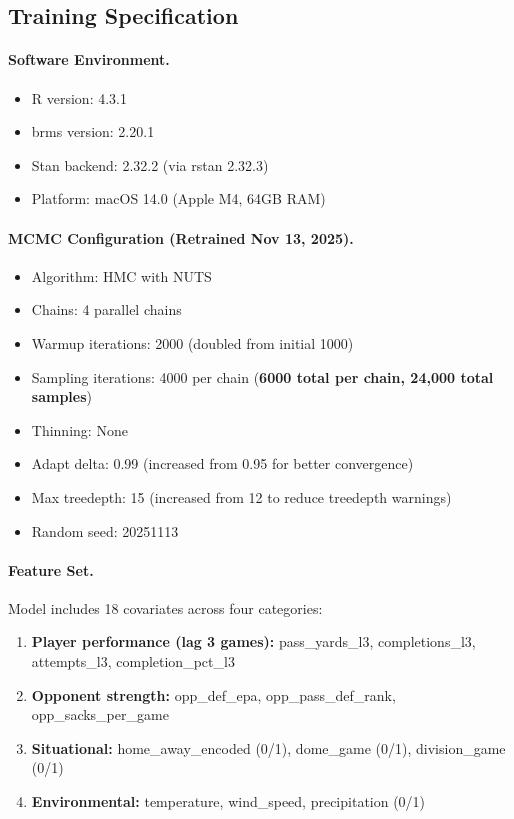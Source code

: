\subsection{Training Specification}

\paragraph{Software Environment.}
\begin{itemize}[itemsep=1pt,parsep=0pt]
    \item R version: 4.3.1
    \item brms version: 2.20.1
    \item Stan backend: 2.32.2 (via rstan 2.32.3)
    \item Platform: macOS 14.0 (Apple M4, 64GB RAM)
\end{itemize}

\paragraph{MCMC Configuration (Retrained Nov 13, 2025).}
\begin{itemize}[itemsep=1pt,parsep=0pt]
    \item Algorithm: HMC with NUTS
    \item Chains: 4 parallel chains
    \item Warmup iterations: 2000 (doubled from initial 1000)
    \item Sampling iterations: 4000 per chain (\textbf{6000 total per chain, 24,000 total samples})
    \item Thinning: None
    \item Adapt delta: 0.99 (increased from 0.95 for better convergence)
    \item Max treedepth: 15 (increased from 12 to reduce treedepth warnings)
    \item Random seed: 20251113
\end{itemize}

\paragraph{Feature Set.}
Model includes 18 covariates across four categories:
\begin{enumerate}[itemsep=1pt,parsep=0pt]
    \item \textbf{Player performance (lag 3 games):} pass\_yards\_l3, completions\_l3, attempts\_l3, completion\_pct\_l3
    \item \textbf{Opponent strength:} opp\_def\_epa, opp\_pass\_def\_rank, opp\_sacks\_per\_game
    \item \textbf{Situational:} home\_away\_encoded (0/1), dome\_game (0/1), division\_game (0/1)
    \item \textbf{Environmental:} temperature, wind\_speed, precipitation (0/1)
\end{enumerate}

